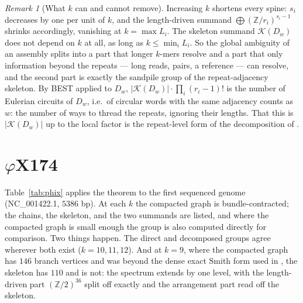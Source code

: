 \documentclass[11pt]{article}
\theoremstyle{plain}
\theoremstyle{definition}
\theoremstyle{remark}
\newtheorem{remark}[theorem]{Remark}
\newcommand{\Z}{\mathbb{Z}}
\newcommand{\K}{\mathcal{K}}
\begin{document}
\begin{remark}[What $k$ can and cannot remove]\label{rem:k}
Increasing $k$ shortens every spine: $s_i$ decreases by one per unit of $k$, and the
length-driven summand $\bigoplus(\Z/r_i)^{s_i-1}$ shrinks accordingly, vanishing at
$k=\max L_i$. The skeleton summand $\K(D_w)$ does not depend on $k$ at all, as long as
$k\le\min_iL_i$. So the global ambiguity of an assembly splits into a part that longer
$k$-mers resolve and a part that only information beyond the repeats --- long reads,
pairs, a reference --- can resolve, and the second part is exactly the sandpile group of
the repeat-adjacency skeleton. By BEST applied to $D_w$, $|\K(D_w)|\cdot\prod_i(r_i-1)!$ is the number
of Eulerian circuits of $D_w$, i.e.\ of circular words with the same adjacency counts as
$w$: the number of ways to thread the repeats, ignoring their lengths. That this is
$|\K(D_w)|$ up to the local factor is the repeat-level form of the decomposition of
\cite{Bio1}.
\end{remark}

\section{$\varphi$X174}\label{sec:phix}

Table~\ref{tab:phix} applies the theorem to the first sequenced genome (NC\_001422.1,
$5386$ bp). At each $k$ the compacted graph is bundle-contracted; the chains, the
skeleton, and the two summands are listed, and where the compacted graph is small enough
the group is also computed directly for comparison. Two things happen. The direct and
decomposed groups agree wherever both exist ($k=10,11,12$). And at $k=9$, where the
compacted graph has $146$ branch vertices and was beyond the dense exact Smith form used
in \cite{Bio1}, the skeleton has $110$ and is not: the spectrum extends by one level, with
the length-driven part $(\Z/2)^{36}$ split off exactly and the arrangement part read off
the skeleton.
\end{document}
